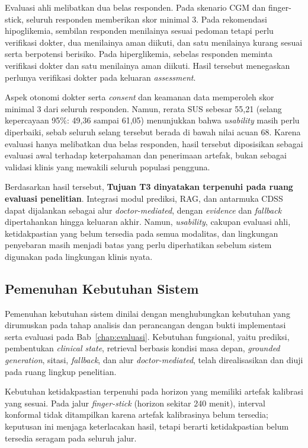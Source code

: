 Evaluasi ahli melibatkan dua belas responden. Pada skenario CGM dan finger-stick, seluruh responden memberikan skor minimal 3. Pada rekomendasi
hipoglikemia, sembilan responden menilainya sesuai pedoman tetapi perlu verifikasi dokter, dua menilainya aman diikuti, dan satu menilainya kurang sesuai serta
berpotensi berisiko. Pada hiperglikemia, sebelas responden meminta verifikasi dokter dan satu menilainya aman diikuti. Hasil tersebut menegaskan perlunya
verifikasi dokter pada keluaran \textit{assessment}.

Aspek otonomi dokter serta \textit{consent} dan keamanan data memperoleh skor minimal 3 dari seluruh responden. Namun, rerata SUS sebesar 55,21 (selang
kepercayaan 95\%: 49,36 sampai 61,05) menunjukkan bahwa \textit{usability} masih perlu diperbaiki, sebab seluruh selang tersebut berada di bawah nilai acuan 68. Karena evaluasi hanya melibatkan dua belas responden, hasil tersebut diposisikan sebagai evaluasi awal terhadap keterpahaman dan penerimaan artefak,
bukan sebagai validasi klinis yang mewakili seluruh populasi pengguna.

Berdasarkan hasil tersebut, \textbf{Tujuan T3 dinyatakan terpenuhi pada ruang evaluasi penelitian}. Integrasi modul prediksi, RAG, dan antarmuka CDSS dapat
dijalankan sebagai alur \textit{doctor-mediated}, dengan \textit{evidence} dan \textit{fallback} dipertahankan hingga keluaran akhir. Namun, \textit{usability}, cakupan evaluasi ahli, ketidakpastian yang
belum tersedia pada semua modalitas, dan lingkungan penyebaran masih menjadi batas yang perlu diperhatikan sebelum sistem digunakan pada lingkungan klinis nyata.

\subsection{Pemenuhan Kebutuhan Sistem}
\label{subsec:bab7-pemenuhan-kebutuhan-sistem}

Pemenuhan kebutuhan sistem dinilai dengan menghubungkan kebutuhan yang dirumuskan pada tahap analisis dan perancangan dengan bukti implementasi serta
evaluasi pada Bab~\ref{chap:evaluasi}. Kebutuhan fungsional, yaitu prediksi, pembentukan \textit{clinical state}, retrieval berbasis kondisi masa depan, \textit{grounded generation}, sitasi,
\textit{fallback}, dan alur \textit{doctor-mediated}, telah direalisasikan dan diuji pada ruang lingkup penelitian.

Kebutuhan ketidakpastian terpenuhi pada horizon yang memiliki artefak kalibrasi yang sesuai. Pada jalur \textit{finger-stick} (horizon sekitar 240 menit),
interval konformal tidak ditampilkan karena artefak kalibrasinya belum tersedia; keputusan ini menjaga keterlacakan hasil, tetapi berarti ketidakpastian
belum tersedia seragam pada seluruh jalur.

